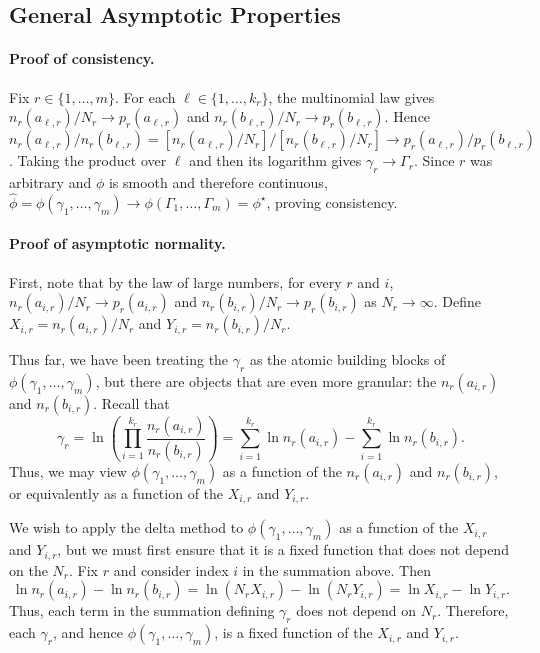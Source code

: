 \documentclass{article}
\begin{document}
\subsection{General Asymptotic Properties}
\label{app:general-asymptotic-properties}

\paragraph{Proof of consistency.}
Fix $r\in\{1,\ldots,m\}$. For each $\ell\in\{1,\ldots,k_r\}$, the
multinomial law gives $n_r(a_{\ell,r})/N_r\to p_r(a_{\ell,r})$ and
$n_r(b_{\ell,r})/N_r\to p_r(b_{\ell,r})$. Hence
$n_r(a_{\ell,r})/n_r(b_{\ell,r})
=[n_r(a_{\ell,r})/N_r]/[n_r(b_{\ell,r})/N_r]
\to p_r(a_{\ell,r})/p_r(b_{\ell,r})$. Taking the
product over $\ell$ and then its logarithm gives $\gamma_r\to\Gamma_r$. Since
$r$ was arbitrary and
$\phi$ is smooth and therefore continuous,
$\widehat{\phi}=\phi(\gamma_1,\ldots,\gamma_m)\to
\phi(\Gamma_1,\ldots,\Gamma_m)=\phi^\star$, proving consistency.

\paragraph{Proof of asymptotic normality.}
First, note that by the law of large numbers, for every $r$ and $i$,
$n_r(a_{i,r})/N_r\to p_r(a_{i,r})$ and
$n_r(b_{i,r})/N_r\to p_r(b_{i,r})$ as $N_r\to\infty$. Define
$X_{i,r}=n_r(a_{i,r})/N_r$ and $Y_{i,r}=n_r(b_{i,r})/N_r$.

Thus far, we have been treating the $\gamma_r$ as the atomic building blocks
of $\phi(\gamma_1,\ldots,\gamma_m)$, but there are objects that are even more
granular: the $n_r(a_{i,r})$ and $n_r(b_{i,r})$. Recall that
\[
\gamma_r=\ln\!\left(\prod_{i=1}^{k_r}
\frac{n_r(a_{i,r})}{n_r(b_{i,r})}\right)
=\sum_{i=1}^{k_r}\ln n_r(a_{i,r})
-\sum_{i=1}^{k_r}\ln n_r(b_{i,r}).
\]
Thus, we may view $\phi(\gamma_1,\ldots,\gamma_m)$ as a function of the
$n_r(a_{i,r})$ and $n_r(b_{i,r})$, or equivalently as a function of the
$X_{i,r}$ and $Y_{i,r}$.

We wish to apply the delta method to $\phi(\gamma_1,\ldots,\gamma_m)$ as a
function of the $X_{i,r}$ and $Y_{i,r}$, but we must first ensure that it is a
fixed function that does not depend on the $N_r$. Fix $r$ and consider index
$i$ in the summation above. Then
\[
\ln n_r(a_{i,r})-\ln n_r(b_{i,r})
=\ln(N_rX_{i,r})-\ln(N_rY_{i,r})
=\ln X_{i,r}-\ln Y_{i,r}.
\]
Thus, each term in the summation defining $\gamma_r$ does not depend on
$N_r$. Therefore, each $\gamma_r$, and hence
$\phi(\gamma_1,\ldots,\gamma_m)$, is a fixed function of the $X_{i,r}$ and
$Y_{i,r}$.
\end{document}
